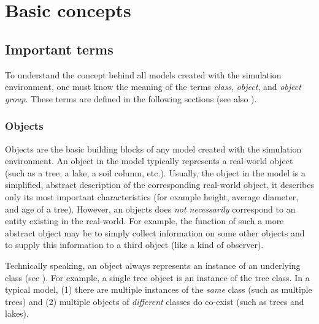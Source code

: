 \chapter{Basic concepts} \label{chap:concept}
\renewcommand{\tabdir}{chapters/concept/tab}
\renewcommand{\figdir}{chapters/concept/fig}

\section{Important terms} \label{sec:concept-terms}

To understand the concept behind all models created with the  simulation environment, one must know the meaning of the terms \emph{class}, \emph{object}, and \emph{object group}. These terms are defined in the following sections (see also  ).

\subsection{Objects} \label{sec:concept-terms-objects}

Objects are the basic building blocks of any model created with the  simulation environment. An object in the model typically represents a real-world object (such as a tree, a lake, a soil column, etc.). Usually, the object in the model is a simplified, abstract description of the corresponding real-world object, \ie{} it describes only its most important characteristics (for example height, average diameter, and age of a tree). However, an objects does \emph{not necessarily} correspond to an entity existing in the real-world. For example, the function of such a more abstract object may be to simply collect information on some other objects and to supply this information to a third object (like a kind of observer).

Technically speaking, an object always represents an instance of an underlying class (see ). For example, a single tree object is an instance of the tree class. In a typical model, (1) there are multiple instances of the \emph{same} class (such as multiple trees) and (2) multiple objects of \emph{different} classes do co-exist (such as trees and lakes).


